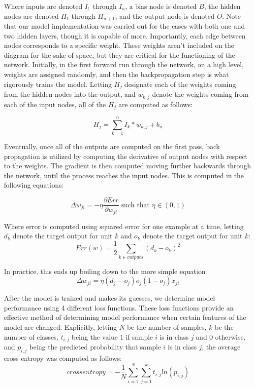 \documentclass[twoside,11pt]{article}
\begin{document}
Where inputs are denoted $I_1$ through $I_n$, a bias node is denoted $B$, the hidden nodes are denoted $H_1$ through $H_{n+1}$, and 
the output node is denoted $O$. Note that our model implementation was carried out for the cases with both one and two hidden layers, though
it is capable of more.
Importantly, each edge between nodes corresponds to a specific weight. These weights aren't included on
the diagram for the sake of space, but they are critical for the functioning of the network. Initially, in the first forward run through the network, 
on a high level, weights are assigned randomly, and then the backpropagation
step is what rigorously trains the model.
Letting $H_j$ designate each of the weights coming from the hidden nodes into the output, and $w_{k,j}$ denote the weights coming from
each of the input nodes, all of the $H_j$ are computed as follows:

\begin{equation}
	H_j = \sum_{k = 1}^{n} I_k*w_{k,j} + b_n
\end{equation}

Eventually, once all of the outputs are computed on the first pass, back propagation is utilized by computing the derivative of output nodes 
with respect to the weights. The gradient is then computed moving further backwards through the network, until the process reaches
the input nodes. This is computed in the following equations:

\begin{equation}
	\Delta w_{ji} = - \eta \frac{\partial Err}{\partial w_{ji}} \text{ such that } \eta \in (0,1)
\end{equation}

Where error is computed using squared error for one example at a time, letting $d_k$ denote the target output for unit $k$ and 
$o_k$ denote the target output for unit $k$:
\begin{equation}
	Err(w) = \frac{1}{2} \sum_{k \in outputs}(d_k - o_k)^2
\end{equation}

In practice, this ends up boiling down to the more simple equation
\begin{equation}
	\Delta w_{ji} = \eta(d_j - o_j)o_j(1-o_j)x_{ji}
\end{equation}

After the model is trained and makes its guesses, we determine model performance using 4 different loss functions.
These loss functions provide an effective method of determining model performance when certain features of the model are changed. Explicitly, letting
$N$ be the number of samples, $k$ be the number of classes, $t_{i,j}$ being the value $1$ if sample $i$ is in class $j$ and $0$ otherwise, and $p_{i,j}$ being the
predicted probability that sample $i$ is in class $j$, the average cross
entropy was computed as follows:
\begin{equation}
	cross entropy = -\frac{1}{N}\sum_{i=1}^{N}\sum_{j=1}^{k}t_{i,j}ln(p_{i,j})
\end{equation}
\end{document}
